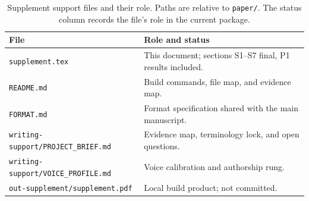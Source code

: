 \begin{table}[pos=htbp]
  \centering
  \caption{Supplement support files and their role. Paths are relative to \texttt{paper/}. The
  status column records the file's role in the current package.}
  \label{tab:suppfiles}
  \small
  \begin{tabularx}{\textwidth}{>{\raggedright\arraybackslash}p{5.0cm}>{\raggedright\arraybackslash}X}
    \toprule
    \textbf{File} & \textbf{Role and status} \\
    \midrule
    \texttt{supplement.tex} & This document; sections S1--S7 final, P1 results included. \\
    \texttt{README.md} & Build commands, file map, and evidence map. \\
    \texttt{FORMAT.md} & Format specification shared with the main manuscript. \\
    \texttt{writing-support/\allowbreak PROJECT\_BRIEF.md} & Evidence map, terminology lock, and open questions. \\
    \texttt{writing-support/\allowbreak VOICE\_PROFILE.md} & Voice calibration and authorship rung. \\
    \texttt{out-supplement/supplement.pdf} & Local build product; not committed. \\
    \bottomrule
  \end{tabularx}
\end{table}

